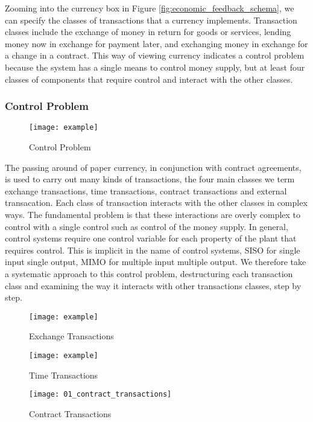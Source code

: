 Zooming into the currency box in Figure \ref{fig:economic_feedback_schema}, we can specify the
classes of transactions that a currency implements. Transaction classes include the exchange of
money in return for goods or services, lending money now in exchange for payment later, and
exchanging money in exchange for a change in a contract. This way of viewing currency indicates a
control problem because the system has a single means to control money supply, but at least four
classes of components that require control and interact with the other classes.

\subsubsection{Control Problem}

\begin{figure}
\centering
\texttt{[image: example]}
\caption{Control Problem}
\label{fig:control_problem}
\end{figure}

The passing around of paper currency, in conjunction with contract agreements, is used to carry
out many kinds of transactions, the four main classes we term exchange transactions, time
transactions, contract transactions and external transacation. Each class of transaction interacts
with the other classes in complex ways. The fundamental problem is that these interactions are
overly complex to control with a single control such as control of the money supply. In general,
control systems require one control variable for each property of the plant that requires control.
This is implicit in the name of control systems, SISO for single input single output, MIMO for
multiple input multiple output. We therefore take a systematic approach to this control problem,
destructuring each transaction class and examining the way it interacts with other transactions
classes, step by step.

\begin{figure}
\centering
\texttt{[image: example]}
\caption{Exchange Transactions}
\label{fig:exchange_transactions}
\end{figure}

\begin{figure}
\centering
\texttt{[image: example]}
\caption{Time Transactions}
\label{fig:time_transactions}
\end{figure}

\begin{figure}
\centering
\texttt{[image: 01\_contract\_transactions]}
\caption{Contract Transactions}
\label{fig:contract_transactions}
\end{figure}

